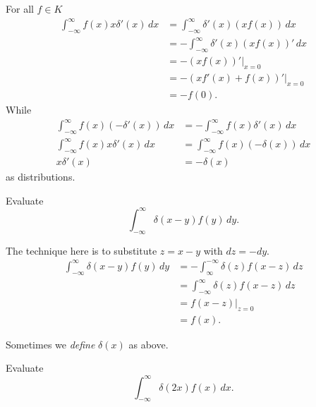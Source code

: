 \begin{solution}
    For all $f \in K$
    \begin{align*}
        \int_{-\infty}^{\infty} f(x) x \delta'(x) \,dx
        &= \int_{-\infty}^{\infty} \delta'(x) \left(xf(x)\right) \,dx \\
        &= -\int_{-\infty}^{\infty} \delta'(x) \left(xf(x)\right)' \,dx \tag{by parts} \\
        &= -(xf(x))' \rvert_{x = 0} \\
        &= -(xf'(x) + f(x))' \rvert_{x = 0} \\
        &= -f(0).
    \end{align*}
    While
    \begin{align*}
        \int_{-\infty}^{\infty} f(x) (-\delta'(x)) \,dx 
        &= -\int_{-\infty}^{\infty} f(x) \delta'(x) \,dx \\
        \int_{-\infty}^{\infty} f(x) x \delta'(x) \,dx 
        &= \int_{-\infty}^{\infty} f(x) (-\delta(x)) \,dx \\
        x\delta'(x) &= -\delta(x)
    \end{align*}
    as distributions.
\end{solution}

\begin{example}
    Evaluate
    \[
        \int_{-\infty}^{\infty} \delta(x-y) f(y) \,dy.
    \]
\end{example}

\begin{solution}
    The technique here is to substitute $z = x - y$ with $dz = -dy$.
    \begin{align*}
        \int_{-\infty}^{\infty} \delta(x-y) f(y) \,dy
        &= -\int_{\infty}^{-\infty} \delta(z) f(x-z) \,dz \\
        &= \int_{-\infty}^{\infty} \delta(z) f(x-z) \,dz \\
        &= f(x-z)\rvert_{z = 0} \\
        &= f(x).
    \end{align*}
\end{solution}

\begin{remark}
    Sometimes we \emph{define} $\delta(x)$ as above.
\end{remark}

\begin{example}
    Evaluate
    \[
        \int_{-\infty}^{\infty} \delta(2x) f(x) \,dx.
    \]
\end{example}

